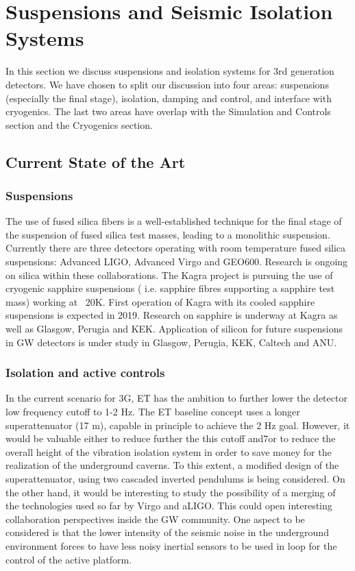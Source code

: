 \section{Suspensions and Seismic Isolation Systems}
In this section we discuss suspensions and isolation systems for 3rd generation detectors. We have chosen to split our discussion into four areas: suspensions (especially the final stage), isolation, damping and control, and interface with cryogenics. The last two areas have overlap with the Simulation and Controls section and the Cryogenics section.
\subsection{Current State of the Art}
\subsubsection{Suspensions}
The use of fused silica fibers is a well-established technique for the final stage of the suspension of fused silica test masses, leading to a monolithic suspension.  Currently there are three detectors operating with room temperature fused silica suspensions: Advanced LIGO, Advanced Virgo and GEO600. Research is ongoing on silica within these collaborations.
The Kagra project is pursuing the use of cryogenic sapphire suspensions ( i.e. sapphire fibres supporting a sapphire test mass) working at ~20K. First operation of Kagra with its cooled sapphire suspensions is expected in 2019.
Research on sapphire is underway at Kagra as well as Glasgow, Perugia and KEK.
Application of silicon for future suspensions in GW detectors is under study in Glasgow, Perugia, KEK, Caltech and ANU.

\subsubsection{Isolation and active controls}
In the current scenario for 3G, ET has the ambition to further lower the detector low frequency cutoff to 1-2 Hz. The ET baseline concept uses a longer superattenuator (17 m), capable in principle to achieve the 2 Hz goal. However, it would be valuable either to reduce further the this cutoff and7or to reduce the overall height of the vibration isolation system in order to save money for the realization of the underground caverns.
To this extent, a modified design of the superattenuator, using two cascaded inverted pendulums is being considered. On the other hand, it would be interesting to study the possibility of a merging of the technologies used so far by Virgo and aLIGO. This could open interesting collaboration perspectives inside the GW community.
One aspect to be considered is that the lower intensity of the seismic noise in the underground environment forces to have less noisy inertial sensors to be used in loop for the control of the active platform. 



